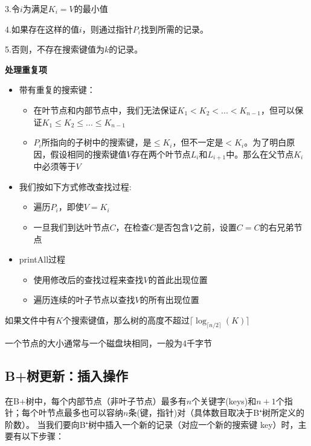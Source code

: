 3.令$i$为满足$K_i=V$的最小值

4.如果存在这样的值$i$，则通过指针$P_i$找到所需的记录。

5.否则，不存在搜索键值为$k$的记录。

\noindent\textbf{处理重复项}

\begin{itemize}
    \item 带有重复的搜索键：
      \begin{itemize}
        \item 在叶节点和内部节点中，我们无法保证$K_1<K_2<...<K_{n-1}$，但可以保证$K_1\leq K_2\leq ...\leq K_{n-1}$
        \item $P_i$所指向的子树中的搜索键，是$\leq K_i$，但不一定是$<K_i$。为了明白原因，假设相同的搜索键值$V$存在两个叶节点$L_i$和$L_{i+1}$中。那么在父节点$K_i$中必须等于$V$
      \end{itemize}
    \item 我们按如下方式修改查找过程:
      \begin{itemize}
        \item 遍历$P_i$，即使$V=K_i$
        \item 一旦我们到达叶节点$C$，在检查$C$是否包含$V$之前，设置$C=C$的右兄弟节点
      \end{itemize}
    \item printAll过程
      \begin{itemize}
        \item 使用修改后的查找过程来查找$V$的首此出现位置
        \item 遍历连续的叶子节点以查找$V$的所有出现位置
      \end{itemize}
\end{itemize}

如果文件中有$K$个搜索键值，那么树的高度不超过$\lceil \log_{\lceil n/2 \rceil}(K) \rceil$

一个节点的大小通常与一个磁盘块相同，一般为4千字节

\subsection{B+树更新：插入操作}

在B+树中，每个内部节点（非叶子节点）最多有$n$个关键字(keys)和$n+1$个指针；每个叶节点最多也可以容纳$n$条(键，指针)对（具体数目取决于B⁺树所定义的阶数）。
当我们要向B⁺树中插入一个新的记录（对应一个新的搜索键 key）时，主要有以下步骤：

